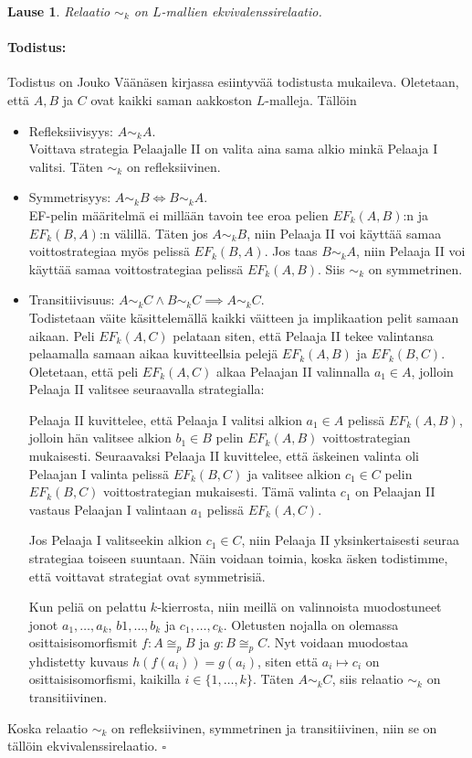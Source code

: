 \documentclass[finnish]{tktltiki2}
\newtheorem{lau}{Lause}
\theoremstyle{definition}
\theoremstyle{remark}
\newenvironment{tod}{\paragraph{Todistus:}}{\hfill$\square$}
\begin{document}
\begin{lau} 
Relaatio $\sim_k$ on $L$-mallien ekvivalenssirelaatio.
\end{lau}
\begin{tod} Todistus on Jouko Väänäsen kirjassa \cite{Vaa11} esiintyvää todistusta mukaileva. Oletetaan, että $A, B$ ja $C$ ovat kaikki saman aakkoston $L$-malleja. Tällöin
\begin{itemize}
\item Refleksiivisyys: $A \sim_k A$.\\
Voittava strategia Pelaajalle II on valita aina sama alkio minkä Pelaaja I valitsi. Täten $\sim_k$ on refleksiivinen.
\item Symmetrisyys: $A \sim_k B \iff B \sim_k A$.\\
EF-pelin määritelmä ei millään tavoin tee eroa pelien $EF_k(A, B)$:n ja $EF_k(B, A)$:n välillä. Täten jos $A \sim_k B$, niin Pelaaja II voi käyttää samaa voittostrategiaa myös pelissä $EF_k(B, A)$. Jos taas $B \sim_k A$, niin Pelaaja II voi käyttää samaa voittostrategiaa pelissä $EF_k(A, B)$. Siis $\sim_k$ on symmetrinen.
\item Transitiivisuus: $A \sim_k C \land B \sim_k C \implies A \sim_k C$.\\
Todistetaan väite käsittelemällä kaikki väitteen ja implikaation pelit samaan aikaan. Peli $EF_k(A, C)$ pelataan siten, että Pelaaja II tekee valintansa pelaamalla samaan aikaa kuvitteellsia pelejä $EF_k(A, B)$ ja $EF_k(B, C)$. Oletetaan, että peli $EF_k(A, C)$ alkaa Pelaajan II valinnalla $a_1 \in A$, jolloin Pelaaja II valitsee seuraavalla strategialla:

Pelaaja II kuvittelee, että Pelaaja I valitsi alkion $a_1 \in A$ pelissä $EF_k(A, B)$, jolloin hän valitsee alkion $b_1 \in B$ pelin $EF_k(A, B)$ voittostrategian mukaisesti. Seuraavaksi Pelaaja II kuvittelee, että äskeinen valinta oli Pelaajan I valinta pelissä $EF_k(B, C)$ ja valitsee alkion $c_1 \in C$ pelin $EF_k(B, C)$ voittostrategian mukaisesti. Tämä valinta $c_1$ on Pelaajan II vastaus Pelaajan I valintaan $a_1$ pelissä $EF_k(A, C)$.

Jos Pelaaja I valitseekin alkion $c_1 \in C$, niin Pelaaja II yksinkertaisesti seuraa strategiaa toiseen suuntaan. Näin voidaan toimia, koska äsken todistimme, että voittavat strategiat ovat symmetrisiä.

Kun peliä on pelattu $k$-kierrosta, niin meillä on valinnoista muodostuneet jonot $a_1, \ldots, a_k$, $b1, \ldots, b_k$ ja $c_1, \ldots, c_k$. Oletusten nojalla on olemassa osittaisisomorfismit $f: A \cong_p B$ ja $g: B \cong_p C$. Nyt voidaan muodostaa yhdistetty kuvaus $h(f(a_i)) = g(a_i)$, siten että $a_i \mapsto c_i$ on osittaisisomorfismi, kaikilla $i \in \{1, \ldots, k\}$. Täten $A \sim_k C$, siis relaatio $\sim_k$ on transitiivinen.
\end{itemize}
Koska relaatio $\sim_k$ on refleksiivinen, symmetrinen ja transitiivinen, niin se on tällöin ekvivalenssirelaatio.
\end{tod}
\\
\end{document}
